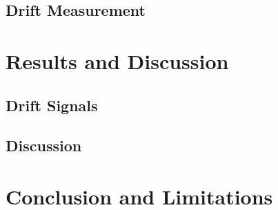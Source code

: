 \documentclass[conference]{IEEEtran}
\begin{document}
\subsection{Drift Measurement}


\section{Results and Discussion}
\subsection{Drift Signals}

\subsection{Discussion}


\section{Conclusion and Limitations}


\clearpage


\end{document}
